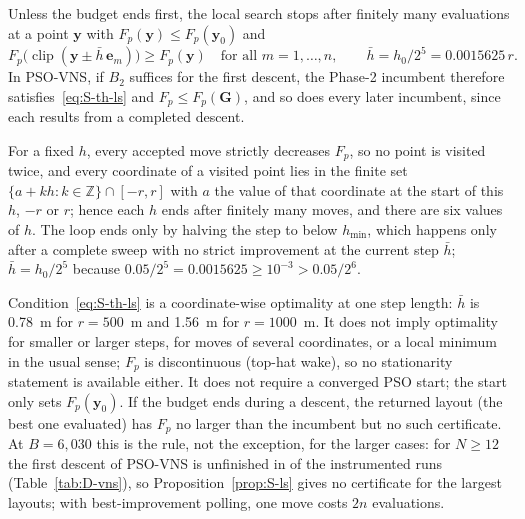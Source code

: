 \begin{thS}
\label{prop:S-ls}
Unless the budget ends first, the local search stops after finitely many evaluations at a point $\mathbf y$ with $F_p(\mathbf y)\le F_p(\mathbf y_0)$ and
\begin{equation}
F_p\bigl(\operatorname{clip}(\mathbf y\pm\bar h\,\mathbf e_m)\bigr)\ge F_p(\mathbf y)\quad\text{for all }m=1,\ldots,n,\qquad \bar h=h_0/2^5=0.0015625\,r .
\label{eq:S-th-ls}
\end{equation}
In PSO-VNS, if $B_2$ suffices for the first descent, the Phase-2 incumbent therefore satisfies~\eqref{eq:S-th-ls} and $F_p\le F_p(\mathbf G)$, and so does every later incumbent, since each results from a completed descent.
\end{thS}
\begin{thSproof}
For a fixed $h$, every accepted move strictly decreases $F_p$, so no point is visited twice, and every coordinate of a visited point lies in the finite set $\{a+kh\colon k\in\mathbb Z\}\cap[-r,r]$ with $a$ the value of that coordinate at the start of this $h$, $-r$ or $r$; hence each $h$ ends after finitely many moves, and there are six values of $h$. The loop ends only by halving the step to below $h_{\min}$, which happens only after a complete sweep with no strict improvement at the current step $\bar h$; $\bar h=h_0/2^5$ because $0.05/2^5=0.0015625\ge10^{-3}>0.05/2^6$.
\end{thSproof}
Condition~\eqref{eq:S-th-ls} is a coordinate-wise optimality at one step length: $\bar h$ is 0.78~m for $r=500$~m and 1.56~m for $r=1000$~m. It does not imply optimality for smaller or larger steps, for moves of several coordinates, or a local minimum in the usual sense; $F_p$ is discontinuous (top-hat wake), so no stationarity statement is available either. It does not require a converged PSO start; the start only sets $F_p(\mathbf y_0)$. If the budget ends during a descent, the returned layout (the best one evaluated) has $F_p$ no larger than the incumbent but no such certificate. At $B=6{,}030$ this is the rule, not the exception, for the larger cases: for $N\ge12$ the first descent of PSO-VNS is unfinished in \NDDescentUnfinishedLargePSOVNS{} of the instrumented runs (Table~\ref{tab:D-vns}), so Proposition~\ref{prop:S-ls} gives no certificate for the largest layouts; with best-improvement polling, one move costs $2n$ evaluations. %
